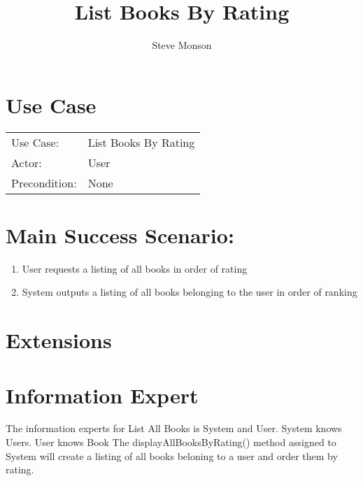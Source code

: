 \documentclass{article}
\title{List Books By Rating}
\author{Steve Monson}
\begin{document}
\maketitle

\section*{Use Case}

\begin{tabular}{l l}
Use Case:     & List Books By Rating \\
Actor:        & User \\
Precondition: & None \\
\end{tabular}

\section*{Main Success Scenario:}

\begin{enumerate}
    \item User requests a listing of all books in order of rating
    \item System outputs a listing of all books belonging to the user in order of ranking
\end{enumerate}

\section*{Extensions}


\begin{itemize}

\end{itemize}

\section*{Information Expert}

The information experts for List All Books is System and User.
System knows Users. User knows Book
The displayAllBooksByRating() method assigned to System will create a listing of all books beloning to a user and order them by rating.
\end{document}
